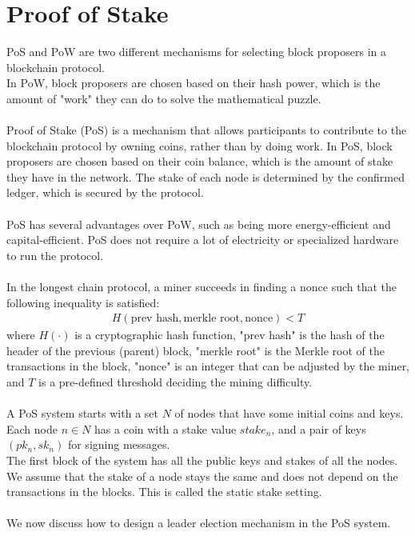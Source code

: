 \section{Proof of Stake}
PoS and PoW are two different mechanisms for selecting block proposers in a blockchain protocol.\\
In PoW, block proposers are chosen based on their hash power, which is the amount of "work" they can do to solve the mathematical puzzle.\\\\
Proof of Stake (PoS) is a mechanism that allows participants to contribute to the blockchain protocol by owning coins, rather than by doing work. In PoS, block proposers are chosen based on their coin balance, which is the amount of stake they have in the network. The stake of each node is determined by the confirmed ledger, which is secured by the protocol.\\\\
PoS has several advantages over PoW, such as being more energy-efficient and capital-efficient. PoS does not require a lot of electricity or specialized hardware to run the protocol.\\\\
In the longest chain protocol, a miner succeeds in finding a nonce such that the following inequality is satisfied:
\begin{align}
    H(\text{prev hash}, \text{merkle root}, \text{nonce}) < T
\end{align}
where $H(·)$ is a cryptographic hash function, "prev hash" is the hash of the header of the previous
(parent) block, "merkle root" is the Merkle root of the transactions in the block, "nonce" is an integer
that can be adjusted by the miner, and $T$ is a pre-defined threshold deciding the mining difficulty.\\\\
A PoS system starts with a set $N$ of nodes that have some initial coins and keys. Each node $n \in N$ has a coin with a stake value $stake_n$, and a pair of keys $(pk_n, sk_n) $ for signing messages.\\
The first block of the system has all the public keys and stakes of all the nodes. We assume that the stake of a node stays the same and does not depend on the transactions in the blocks. This is called the static stake setting.\\\\
We now discuss how to design a leader election mechanism in the PoS system.


